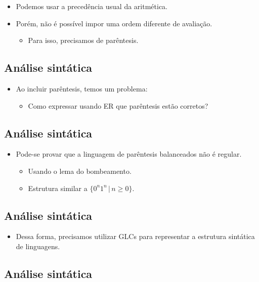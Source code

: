 \documentclass[11pt]{article}
\begin{document}
\begin{itemize}
\item Podemos usar a precedência usual da aritmética.

\item Porém, não é possível impor uma ordem diferente de avaliação.
\begin{itemize}
\item Para isso, precisamos de parêntesis.
\end{itemize}
\end{itemize}
\subsection*{Análise sintática}
\label{sec:org95272e4}

\begin{itemize}
\item Ao incluir parêntesis, temos um problema:
\begin{itemize}
\item Como expressar usando ER que parêntesis estão corretos?
\end{itemize}
\end{itemize}
\subsection*{Análise sintática}
\label{sec:orgbe2b490}

\begin{itemize}
\item Pode-se provar que a linguagem de parêntesis balanceados não é regular.
\begin{itemize}
\item Usando o lema do bombeamento.
\item Estrutura similar a \(\{0^n1^n\,|\,n\geq 0\}\).
\end{itemize}
\end{itemize}
\subsection*{Análise sintática}
\label{sec:orgfb76efd}

\begin{itemize}
\item Dessa forma, precisamos utilizar GLCs para representar a estrutura sintática
de linguagens.
\end{itemize}
\subsection*{Análise sintática}
\label{sec:org97dd7e3}
\end{document}
